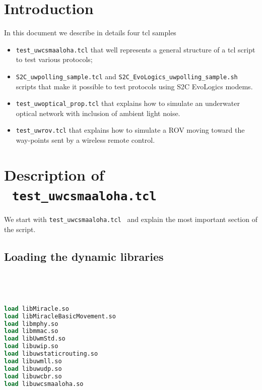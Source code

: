 \documentclass[11pt]{article}
\begin{document}

\begin{center}
    \begin{LARGE}  \end{LARGE}
\end{center}


\vspace{0.8cm}
\section{Introduction}
In this document we describe in details four tcl samples
\begin{itemize}
  \item{\tt test\_uwcsmaaloha.tcl} that well represents a general structure of a tcl script to test various protocols;
  \item{\tt S2C\_uwpolling\_sample.tcl} and {\tt S2C\_EvoLogics\_uwpolling\_sample.sh} scripts that make it possible to test protocols using S2C EvoLogics modems.
  \item{\tt test\_uwoptical\_prop.tcl} that explains how to simulate an underwater optical network with inclusion of ambient light noise.
  \item{\tt test\_uwrov.tcl} that explains how to simulate a ROV moving toward the way-points sent by a wireless remote control.
\end{itemize}



\section{Description of \ {\tt test\_uwcsmaaloha.tcl}}
\label{sec:uwcsmaaloha}

We start with {\tt test\_uwcsmaaloha.tcl } and explain the most important section of the script.



\subsection{Loading the dynamic libraries}
\ 
{\scriptsize\tt
\begin{lstlisting}[language=tcl]
load libMiracle.so
load libMiracleBasicMovement.so
load libmphy.so
load libmmac.so
load libUwmStd.so
load libuwip.so
load libuwstaticrouting.so
load libuwmll.so
load libuwudp.so
load libuwcbr.so
load libuwcsmaaloha.so
\end{lstlisting}
}
\end{document}
